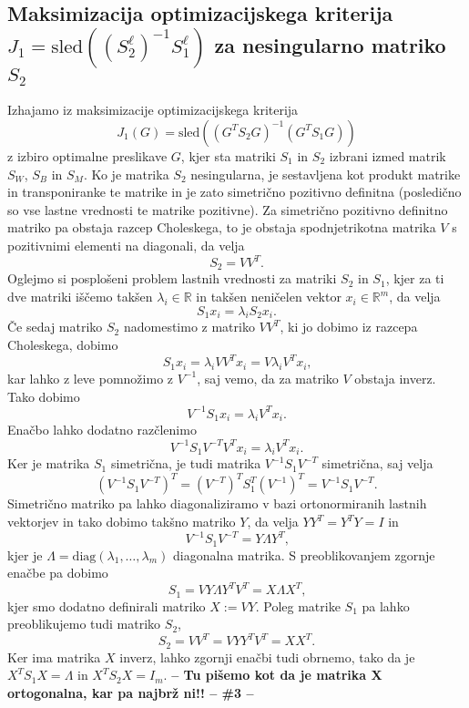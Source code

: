 \documentclass[mat1]{article}
\theoremstyle{definition}
\begin{document}
\subsection{Maksimizacija optimizacijskega kriterija $J_1 = \text{sled} \left((S^\ell_2)^{-1} S^\ell_1 \right)$ za nesingularno matriko $S_2$}
Izhajamo iz maksimizacije optimizacijskega kriterija 
$$J_1(G) = \text{sled}\left((G^T S_2 G)^{-1} (G^T S_1 G)\right)$$
z izbiro optimalne preslikave $G$, kjer sta matriki $S_1$ in $S_2$ izbrani izmed matrik $S_W$, $S_B$ in $S_M$. Ko je matrika $S_2$ nesingularna, je sestavljena kot produkt matrike in transponiranke te matrike in je zato simetrično pozitivno definitna (posledično so vse lastne vrednosti te matrike pozitivne). Za simetrično pozitivno definitno matriko pa obstaja razcep Choleskega, to je obstaja spodnjetrikotna matrika $V$ s pozitivnimi elementi na diagonali, da velja
$$ S_2 = V V^T \text{.}
$$
Oglejmo si posplošeni problem lastnih vrednosti za matriki $S_2$ in $S_1$, kjer za ti dve matriki iščemo takšen $\lambda_i \in \mathbb{R}$ in takšen neničelen vektor $x_i \in \mathbb{R}^m$, da velja
\begin{equation} \label{pos-prob-last-v}
S_1 x_i = \lambda_i S_2 x_i
\text{.}
\end{equation}
Če sedaj matriko $S_2$ nadomestimo z matriko $VV^T$, ki jo dobimo iz razcepa Choleskega, dobimo
$$
S_1 x_i = \lambda_i V V^T x_i = V \lambda_i V^T x_i
\text{,}
$$
kar lahko z leve pomnožimo z $V^{-1}$, saj vemo, da za matriko $V$ obstaja inverz. Tako dobimo
$$
V^{-1} S_1 x_i = \lambda_i V^T x_i
\text{.}
$$
Enačbo lahko dodatno razčlenimo
$$
V^{-1} S_1 V^{-T} V^T x_i = \lambda_i V^T x_i
\text{.}
$$
Ker je matrika $S_1$ simetrična, je tudi matrika $V^{-1} S_1 V^{-T}$ simetrična, saj velja
$$
(V^{-1} S_1 V^{-T})^T =  (V^{-T})^T S_1^T (V^{-1})^T =  V^{-1} S_1 V^{-T}
\text{.}
$$
Simetrično matriko pa lahko diagonaliziramo v bazi ortonormiranih lastnih vektorjev in tako dobimo takšno matriko $Y$, da velja $Y Y^T = Y^T Y = I $ in 
$$
V^{-1} S_1 V^{-T} = Y \Lambda Y^T
\text{,}
$$
kjer je $\Lambda = \text{diag}\left(\lambda_1, \ldots, \lambda_m \right)$ diagonalna matrika. S preoblikovanjem zgornje enačbe pa dobimo
$$
S_1 = VY \Lambda Y^TV^T = X \Lambda X^T
\text{,}
$$
kjer smo dodatno definirali matriko $X := VY$.
Poleg matrike $S_1$ pa lahko preoblikujemo tudi matriko $S_2$,
$$
S_2 = VV^T = VYY^TV^T = XX^T
\text{.}
$$
Ker ima matrika $X$ inverz, lahko zgornji enačbi tudi obrnemo, tako da je $X^T S_1 X = \Lambda$ in $X^T S_2 X = I_m$.
\textbf{-- Tu pišemo kot da je matrika X ortogonalna, kar pa najbrž ni!! -- \#3 --}
\end{document}
